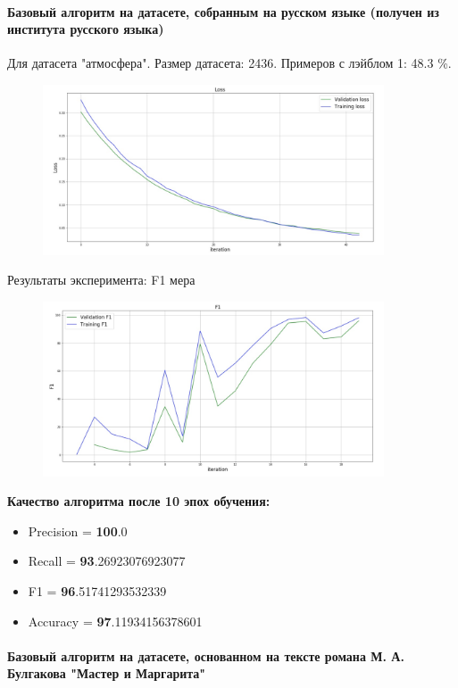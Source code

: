 \documentclass[12pt,twoside]{article}
\begin{document}
\paragraph{Базовый алгоритм на датасете, собранным на русском языке (получен из института русского языка)}
Для датасета "атмосфера". Размер датасета:  2436. Примеров с лэйблом 1: 48.3 \%.
	\begin{figure}[H]
		\centering
		\includegraphics[width=0.9\textwidth]{./__pics/rus_loss}
	\end{figure}
	Результаты эксперимента: F1 мера
	\begin{figure}[H]
		\centering
		\includegraphics[width=0.9\textwidth]{./__pics/rus_F1}
	\end{figure}
	
	\textbf{Качество алгоритма после 10 эпох обучения:}
	\begin{itemize}
		\item Precision =  \textbf{100}.0
		\item Recall =  \textbf{93}.26923076923077
		\item F1 =  \textbf{96}.51741293532339
		\item Accuracy  =  \textbf{97}.11934156378601
	\end{itemize}

\paragraph{Базовый алгоритм на датасете, основанном на тексте романа М. А. Булгакова "Мастер и Маргарита"}
	
\end{document}
